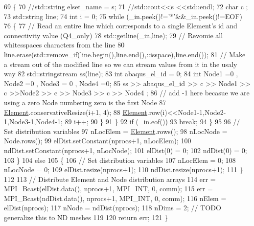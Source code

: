 \begin{DoxyCode}
69       \{
70         \textcolor{comment}{//std::string elset\_name = s;}
71         \textcolor{comment}{//std::cout<<s <<std::endl;}
72         \textcolor{keywordtype}{char} c ;
73         std::string line;
74         \textcolor{keywordtype}{int} i = 0;
75         \textcolor{keywordflow}{while} (\_in.peek()!=\textcolor{charliteral}{'*'}&&\_in.peek()!=EOF)
76         \{
77           \textcolor{comment}{// Read an entire line which corresponds to a single Element's id and connectivity value
       (Q4\_only)}
78           std::getline(\_in,line);
79           \textcolor{comment}{// Revomie all whitesspaces characters from the line}
80           line.erase(std::remove\_if(line.begin(),line.end(),::isspace),line.end());
81           \textcolor{comment}{// Make a stream out of the modified line so we can stream values from it in the usaly way}
82           std::stringstream ss(line);
83           \textcolor{keywordtype}{int} abaqus\_el\_id = 0;
84           \textcolor{keywordtype}{int} Node1 =0 , Node2 =0 , Node3 = 0 , Node4 =0;
85           ss >> abaqus\_el\_id >> c >> Node1 >> c >>Node2 >> c >> Node3 >> c >> Node4 ;
86           \textcolor{comment}{// add -1 here becasue we are using a zero Node numbering zero is the first Node}
87           \mbox{\hyperlink{class_element}{Element}}.conservativeResize(i+1, 4);
88           \mbox{\hyperlink{class_element}{Element}}.row(i)<<Node1-1,Node2-1,Node3-1,Node4-1;
89           i++;
90         \}
91       \}
92       \textcolor{keywordflow}{if} (\_in.eof())
93         \textcolor{keywordflow}{break};
94     \}
95 
96     \textcolor{comment}{// Set distribution variables}
97     nLocElem = \mbox{\hyperlink{class_element}{Element}}.rows();
98     nLocNode = Node.rows();
99     elDist.setConstant(nprocs+1, nLocElem);
100     ndDist.setConstant(nprocs+1, nLocNode);
101     elDist(0) = 0;
102     ndDist(0) = 0;
103   \}
104   \textcolor{keywordflow}{else}
105   \{
106     \textcolor{comment}{// Set distribution variables}
107     nLocElem = 0;
108     nLocNode = 0;
109     elDist.resize(nprocs+1);
110     ndDist.resize(nprocs+1);
111   \}
112 
113   \textcolor{comment}{// Distribute Element and Node distribution arrays}
114   err = MPI\_Bcast(elDist.data(), nprocs+1, MPI\_INT, 0, comm);
115   err = MPI\_Bcast(ndDist.data(), nprocs+1, MPI\_INT, 0, comm);
116   nElem = elDist(nprocs);
117   nNode = ndDist(nprocs);
118   nDims = 2; \textcolor{comment}{// TODO generalize this to ND meshes}
119 
120   \textcolor{keywordflow}{return} err;
121 \}
\end{DoxyCode}
\mbox{\label{class_mesh_a1c915802d56c4ded24e460e83cfb5399}} 
